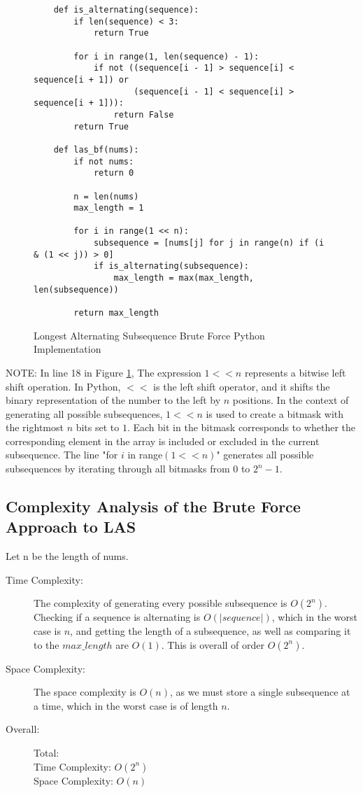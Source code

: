 \begin{figure}[H]
    \centering
    \begin{lstlisting}
    def is_alternating(sequence):
        if len(sequence) < 3:
            return True
    
        for i in range(1, len(sequence) - 1):
            if not ((sequence[i - 1] > sequence[i] < sequence[i + 1]) or
                    (sequence[i - 1] < sequence[i] > sequence[i + 1])):
                return False
        return True
    
    def las_bf(nums):
        if not nums:
            return 0
    
        n = len(nums)
        max_length = 1
    
        for i in range(1 << n):
            subsequence = [nums[j] for j in range(n) if (i & (1 << j)) > 0]
            if is_alternating(subsequence):
                max_length = max(max_length, len(subsequence))
    
        return max_length
    \end{lstlisting}
    \caption{Longest Alternating Subsequence Brute Force Python Implementation}
    \label{fig:las-bf}
\end{figure}


NOTE: In line 18 in Figure \ref{fig:las-bf}, The expression $1 << n$ represents a bitwise left shift operation.
In Python, $<<$ is the left shift operator, and it shifts the binary representation of the number to the left by $n$ positions.
In the context of generating all possible subsequences, $1 << n$ is used to create a bitmask with the rightmost $n$ bits set to $1$.
Each bit in the bitmask corresponds to whether the corresponding element in the array is included or excluded in the current subsequence.
The line "for $i$ in range$(1 << n)$" generates all possible subsequences by iterating through all bitmasks from 0 to $2^n-1$.

\subsection{Complexity Analysis of the Brute Force Approach to LAS}
Let n be the length of nums.
\begin{description}
    \item[Time Complexity:]
        The complexity of generating every possible subsequence is $O(2^n)$.
        Checking if a sequence is alternating is $O(|sequence|)$, which in the worst case is $n$,
        and getting the length of a subsequence, as well as comparing it to the $max\_length$ are $O(1)$.
        This is overall of order $O(2^n)$.
        
    \item[Space Complexity:] 
        The space complexity is $O(n)$, as we must store a single subsequence at a time,
        which in the worst case is of length $n$.
        
    \item[Overall:] Total:\\
        Time Complexity: $O(2^n)$\\
        Space Complexity: $O(n)$
    
\end{description}


